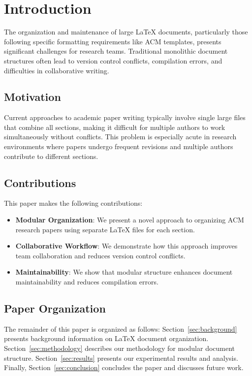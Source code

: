 
\section{Introduction}

The organization and maintenance of large LaTeX documents, particularly those following 
specific formatting requirements like ACM templates, presents significant challenges for 
research teams. Traditional monolithic document structures often lead to version control 
conflicts, compilation errors, and difficulties in collaborative writing. 

\subsection{Motivation}

Current approaches to academic paper writing typically involve single large files that 
combine all sections, making it difficult for multiple authors to work simultaneously 
without conflicts. This problem is especially acute in research environments where 
papers undergo frequent revisions and multiple authors contribute to different sections.

\subsection{Contributions}

This paper makes the following contributions:

\begin{itemize}
    \item \textbf{Modular Organization}: We present a novel approach to organizing 
          ACM research papers using separate LaTeX files for each section.
    \item \textbf{Collaborative Workflow}: We demonstrate how this approach improves 
          team collaboration and reduces version control conflicts.
    \item \textbf{Maintainability}: We show that modular structure enhances 
          document maintainability and reduces compilation errors.
\end{itemize}

\subsection{Paper Organization}

The remainder of this paper is organized as follows: Section~\ref{sec:background} 
presents background information on LaTeX document organization. Section~\ref{sec:methodology} 
describes our methodology for modular document structure. Section~\ref{sec:results} 
presents our experimental results and analysis. Finally, Section~\ref{sec:conclusion} 
concludes the paper and discusses future work. 